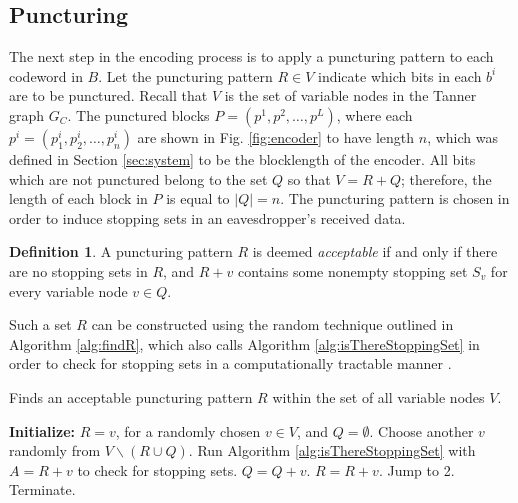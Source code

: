 \documentclass[10pt,twocolumn,twoside]{IEEEtran} \newlength{\pic}
\theoremstyle{definition}
\newtheorem{definition}{Definition}
\theoremstyle{remark}
\theoremstyle{plain}
\begin{document}
\subsection{Puncturing}\label{subsec:puncturing}

The next step in the encoding process is to apply a puncturing pattern to each codeword in $B$. Let the puncturing pattern $R\in V$ indicate which bits in each $b^i$ are to be punctured. Recall that $V$ is the set of variable nodes in the Tanner graph $G_C$. The punctured blocks $P = (p^1, p^2, \ldots, p^L)$, where each $p^i = (p_1^i, p_2^i, \ldots, p_{n}^i)$ are shown in Fig. \ref{fig:encoder} to have length $n$, which was defined in Section \ref{sec:system} to be the blocklength of the encoder. All bits which are not punctured belong to the set $Q$ so that $V = R + Q$; therefore, the length of each block in $P$ is equal to $|Q|=n$. The puncturing pattern is chosen in order to induce stopping sets in an eavesdropper's received data.
\begin{definition}\label{def:acceptable}
 A puncturing pattern $R$ is deemed \emph{acceptable} if and only if there are no stopping sets in $R$, and $R + v$ contains some nonempty stopping set $S_v$ for every variable node $v \in Q$.
\end{definition}
Such a set $R$ can be constructed using the random technique outlined in Algorithm \ref{alg:findR}, which also calls Algorithm \ref{alg:isThereStoppingSet} in order to check for stopping sets in a computationally tractable manner \cite{Harrison10_ITW}.

\begin{algorithm}[h]
\caption{Finds an acceptable puncturing pattern $R$ within the set of all variable nodes $V$.}
\begin{algorithmic}[1]
\STATE \textbf{Initialize:} $R = v$, for a randomly chosen $v\in V$, and $Q = \emptyset$.
    \STATE Choose another $v$ randomly from $V\backslash(R\cup Q)$.
    \STATE Run Algorithm \ref{alg:isThereStoppingSet} with $A = R + v$ to check for stopping sets.
      \STATE $Q = Q + v$.
    \ELSE
        \STATE $R = R + v$.
    \ENDIF
    \STATE Jump to 2.
  \ELSE
    \STATE Terminate.
  \ENDIF
\end{algorithmic}
\label{alg:findR}
\end{algorithm}
\end{document}
